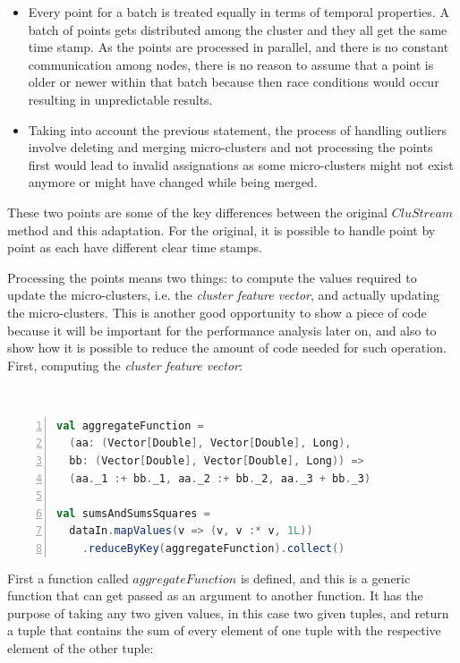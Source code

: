 \documentclass[10pt, conference, compsocconf]{IEEEtran}
\begin{document}
\begin{itemize}
 \item Every point for a batch is treated equally in terms of temporal properties. A batch of points gets distributed among the cluster and they all get the same time stamp. As the points are processed in parallel, and there is no constant communication among nodes, there is no reason to assume that a point is older or newer within that batch because then race conditions would occur resulting in unpredictable results.
\item Taking into account the previous statement, the process of handling outliers involve deleting and merging micro-clusters and not processing the points first would lead to invalid assignations as some micro-clusters might not exist anymore or might have changed while being merged.
\end{itemize}

These two points are some of the key differences between the original $CluStream$ method and this adaptation. For the original, it is possible to handle point by point as each have different clear time stamps.

Processing the points means two things: to compute the values required to update the micro-clusters, i.e. the \textit{cluster feature vector}, and actually updating the micro-clusters. This is another good opportunity to show a piece of code because it will be important for the performance analysis later on, and also to show how it is possible to reduce the amount of code needed for such operation. First, computing the \textit{cluster feature vector}:

\
\begin{lstlisting}[language=Scala, tabsize=2, breaklines=true,basicstyle=\footnotesize,frame=lines,numbers=left]
val aggregateFunction = 
  (aa: (Vector[Double], Vector[Double], Long), 
  bb: (Vector[Double], Vector[Double], Long)) =>                     
  (aa._1 :+ bb._1, aa._2 :+ bb._2, aa._3 + bb._3)
		
val sumsAndSumsSquares = 
  dataIn.mapValues(v => (v, v :* v, 1L))
    .reduceByKey(aggregateFunction).collect()
\end{lstlisting}

First a function called $aggregateFunction$ is defined, and this is a generic function that can get passed as an argument to another function. It has the purpose of taking any two given values, in this case two given tuples, and return a tuple that contains the sum of every element of one tuple with the respective element of the other tuple: 
\end{document}
